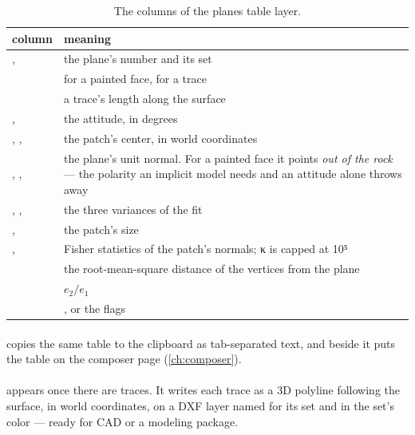 \begin{table}[htbp]\small
\begin{tabularx}{\linewidth}{@{}lL@{}}\toprule
column & meaning \\ \midrule
{},  & the plane's number and its set \\
 &  for a painted face,  for a trace \\
 & a trace's length along the surface \\
,  & the attitude, in degrees \\
, ,  & the patch's center, in world coordinates \\
, ,  & the plane's unit normal. For a painted face it points \emph{out of the rock} — the polarity an implicit model needs and an attitude alone throws away \\
, ,  & the three variances of the fit \\
,  & the patch's size \\
,  & Fisher statistics of the patch's normals; κ is capped at 10⁵ \\
 & the root-mean-square distance of the vertices from the plane \\
 & $e_2/e_1$ \\
 & , or the flags \\ \bottomrule
\end{tabularx}
\caption{The columns of the planes table layer.}\label{tab:structure-columns}
\end{table}

\paragraph{} copies the same table to the clipboard as tab-separated text, and  beside it puts the table on the composer page (\cref{ch:composer}).

\paragraph{} appears once there are traces. It writes each trace as a 3D polyline following the surface, in world coordinates, on a DXF layer named for its set and in the set's color — ready for CAD or a modeling package.


